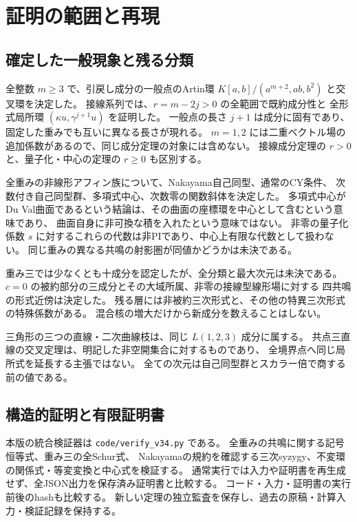 \section{証明の範囲と再現}

\subsection{確定した一般現象と残る分類}

全整数 $m\ge3$ で、引戻し成分の一般点のArtin環
$K[a,b]/(a^{m+2},ab,b^2)$ と交叉環を決定した。
接線系列では、$r=m-2j>0$ の全範囲で既約成分性と
全形式局所環 $(\kappa u,\gamma^{j+1}u)$ を証明した。
一般点の長さ $j+1$ は成分に固有であり、固定した重みでも互いに異なる長さが現れる。
$m=1,2$ には二重ベクトル場の追加係数があるので、同じ成分定理の対象には含めない。
接線成分定理の $r>0$ と、量子化・中心の定理の $r\ge0$ も区別する。

全重みの非線形アフィン族について、Nakayama自己同型、通常のCY条件、
次数付き自己同型群、多項式中心、次数零の関数斜体を決定した。
多項式中心がDu Val曲面であるという結論は、その曲面の座標環を中心として含むという意味であり、
曲面自身に非可換な積を入れたという意味ではない。
非零の量子化係数 $s$ に対するこれらの代数は非PIであり、中心上有限な代数として扱わない。
同じ重みの異なる共鳴の射影圏が同値かどうかは未決である。

重み三では少なくとも十成分を認定したが、全分類と最大次元は未決である。
$c=0$ の被約部分の三成分とその大域所属、非零の接線型線形場に対する
四共鳴の形式近傍は決定した。
残る層には非被約三次形式と、その他の特異三次形式の特殊係数がある。
混合核の増大だけから新成分を数えることはしない。

三角形の三つの直線・二次曲線枝は、同じ $L(1,2,3)$ 成分に属する。
共点三直線の交叉定理は、明記した非空開集合に対するものであり、
全境界点へ同じ局所式を延長する主張ではない。
全ての次元は自己同型群とスカラー倍で商する前の値である。

\subsection{構造的証明と有限証明書}

本版の統合検証器は \nolinkurl{code/verify_v34.py} である。
全重みの共鳴に関する記号恒等式、重み三の全Schur式、
Nakayamaの規約を確認する三次syzygy、不変環の関係式・等変変換と中心式を検証する。
通常実行では入力や証明書を再生成せず、全JSON出力を保存済み証明書と比較する。
コード・入力・証明書の実行前後のhashも比較する。
新しい定理の独立監査を保存し、過去の原稿・計算入力・検証記録を保持する。

